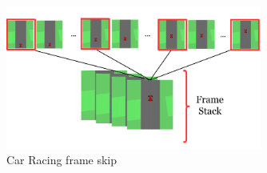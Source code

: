 \begin{figure}[H]
  \centering
  \includegraphics[width=0.75\textwidth]{figures/images/frame_skip.png}
  \caption[Car Racing frame skip]{Car Racing frame skip \cite{montoya2021decoupling}}
  \label{fig:frame_skip}
\end{figure}
